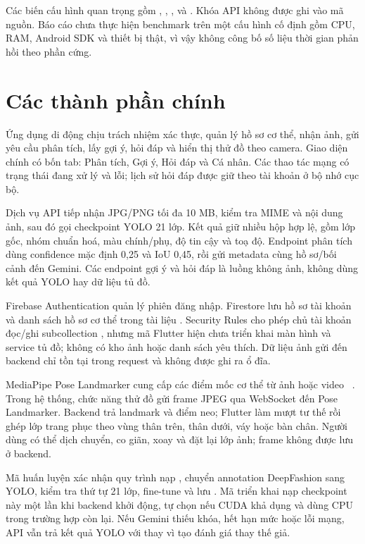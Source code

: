 Các biến cấu hình quan trọng gồm ,
, ,
 và . Khóa API không được
ghi vào mã nguồn. Báo cáo chưa thực hiện benchmark trên một cấu hình cố định
gồm CPU, RAM, Android SDK và thiết bị thật, vì vậy không công bố số liệu thời
gian phản hồi theo phần cứng.

\section{Các thành phần chính}

Ứng dụng di động chịu trách nhiệm xác thực, quản lý hồ sơ cơ thể, nhận ảnh,
gửi yêu cầu phân tích, lấy gợi ý, hỏi đáp và hiển thị thử đồ theo camera.
Giao diện chính có bốn tab: Phân tích, Gợi ý, Hỏi đáp và Cá nhân. Các thao
tác mạng có trạng thái đang xử lý và lỗi; lịch sử hỏi đáp được giữ theo tài
khoản ở bộ nhớ cục bộ.

Dịch vụ API tiếp nhận JPG/PNG tối đa 10 MB, kiểm tra MIME và nội dung ảnh,
sau đó gọi checkpoint YOLO 21 lớp. Kết quả giữ nhiều hộp hợp lệ, gồm lớp gốc,
nhóm chuẩn hoá, màu chính/phụ, độ tin cậy và toạ độ. Endpoint phân tích dùng
confidence mặc định 0,25 và IoU 0,45, rồi gửi metadata cùng hồ sơ/bối cảnh
đến Gemini. Các endpoint gợi ý và hỏi đáp là luồng không ảnh, không dùng kết
quả YOLO hay dữ liệu tủ đồ.

Firebase Authentication quản lý phiên đăng nhập. Firestore lưu hồ sơ tài
khoản và danh sách hồ sơ cơ thể trong tài liệu . Security
Rules cho phép chủ tài khoản đọc/ghi subcollection
, nhưng mã Flutter hiện chưa triển khai màn hình và
service tủ đồ; không có kho ảnh hoặc danh sách yêu thích. Dữ liệu ảnh gửi đến
backend chỉ tồn tại trong request và không được ghi ra ổ đĩa.

MediaPipe Pose Landmarker cung cấp các điểm mốc cơ thể từ ảnh hoặc video
~\cite{MediaPipePose}. Trong hệ thống, chức năng thử đồ gửi frame JPEG qua
WebSocket đến Pose Landmarker. Backend trả landmark và điểm neo; Flutter làm
mượt tư thế rồi ghép lớp trang
phục theo vùng thân trên, thân dưới, váy hoặc bàn chân. Người dùng có thể dịch
chuyển, co giãn, xoay và đặt lại lớp ảnh; frame không được lưu ở backend.

Mã huấn luyện xác nhận quy trình nạp , chuyển annotation
DeepFashion sang YOLO, kiểm tra thứ tự 21 lớp, fine-tune và lưu
. Mã triển khai nạp checkpoint này một lần khi backend khởi
động, tự chọn  nếu CUDA khả dụng và dùng CPU trong trường hợp
còn lại. Nếu Gemini thiếu khóa, hết hạn mức hoặc lỗi mạng, API vẫn trả kết
quả YOLO với  thay vì tạo đánh giá thay thế giả.

